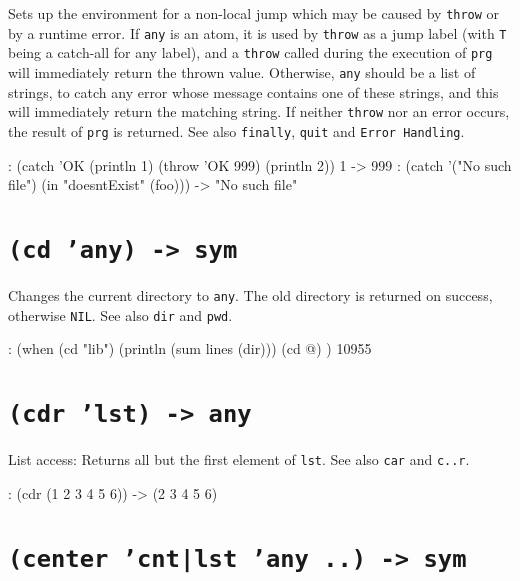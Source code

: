 Sets up the environment for a non-local jump which may be caused by
\texttt{throw} or by a runtime error. If \texttt{any} is an atom, it is used by
\texttt{throw} as a jump label (with \texttt{T} being a catch-all for any label), and
a \texttt{throw} called during the execution of \texttt{prg} will immediately return
the thrown value. Otherwise, \texttt{any} should be a list of strings, to catch
any error whose message contains one of these strings, and this will
immediately return the matching string. If neither \texttt{throw} nor an error
occurs, the result of \texttt{prg} is returned. See also \texttt{finally}, \texttt{quit} and
\texttt{Error Handling}.


\begin{wideverbatim}
: (catch 'OK (println 1) (throw 'OK 999) (println 2))
1
-> 999
: (catch '("No such file") (in "doesntExist" (foo)))
-> "No such file"
\end{wideverbatim}

 
\section*{\texttt{(cd 'any) -> sym}}
\label{sec:funct-rec-C-(cd-'any)-->-sym}


Changes the current directory to \texttt{any}. The old directory is returned on
success, otherwise \texttt{NIL}. See also \texttt{dir} and \texttt{pwd}.


\begin{wideverbatim}
: (when (cd "lib")
   (println (sum lines (dir)))
   (cd @) )
10955
\end{wideverbatim}

 
\section*{\texttt{(cdr 'lst) -> any}}
\label{sec:funct-rec-C-(cdr-'lst)-->-any}


List access: Returns all but the first element of \texttt{lst}. See also \texttt{car}
and \texttt{c..r}.


\begin{wideverbatim}
: (cdr (1 2 3 4 5 6))
-> (2 3 4 5 6)
\end{wideverbatim}

 
\section*{\texttt{(center 'cnt|lst 'any ..) -> sym}}
\label{sec:funct-rec-C-(center-'cnt|lst-'any-..)-->-sym}


